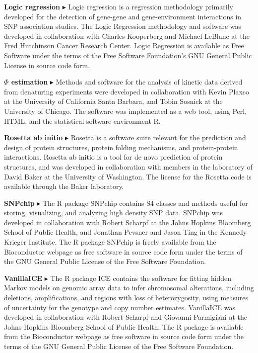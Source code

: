 \documentclass[10pt]{article}
\begin{document}
\item 
{\bf Logic regression} $\blacktriangleright$
Logic regression is a regression methodology primarily developed for the detection of gene-gene and gene-environment interactions in SNP association studies. The Logic Regression methodology and software was developed in collaboration with Charles Kooperberg and Michael LeBlanc at the Fred Hutchinson Cancer Research Center. Logic Regression is available as Free Software under the terms of the Free Software Foundation's GNU General Public License in source code form.
\item 
{\bf $\Phi$ estimation} $\blacktriangleright$
Methods and software for the analysis of kinetic data derived from denaturing experiments were developed in collaboration with Kevin Plaxco at the University of California Santa Barbara, and Tobin Sosnick at the University of Chicago. The software was implemented as a web tool, using Perl, HTML, and the statistical software environment R.
\item
{\bf Rosetta ab initio} $\blacktriangleright$
Rosetta is a software suite relevant for the prediction and design of protein structures, protein folding mechanisms, and protein-protein interactions. Rosetta ab initio is a tool for de novo prediction of protein structures, and was developed in collaboration with members in the laboratory of David Baker at the University of Washington. The license for the Rosetta code is available through the Baker laboratory. 
\item 
{\bf SNPchip} $\blacktriangleright$
The R package SNPchip contains S4 classes and methods useful for storing, visualizing, and analyzing high density SNP data. SNPchip was developed in collaboration with Robert Scharpf at the Johns Hopkins Bloomberg School of Public Health, and Jonathan Pevsner and Jason Ting in the Kennedy Krieger Institute. The R package SNPchip is freely available from the Bioconductor webpage as free software in source code form under the terms of the GNU General Public License of the Free Software Foundation.
\item
{\bf VanillaICE} $\blacktriangleright$
The R package ICE contains the software for fitting hidden Markov models on genomic array data to infer chromosomal alterations, including deletions, amplifications, and regions with loss of heterozygosity, using measures of uncertainty for the genotype and copy number estimates. VanillaICE was developed in collaboration with Robert Scharpf and Giovanni Parmigiani at the Johns Hopkins Bloomberg School of Public Health. The R package is available from the Bioconductor webpage as free software in source code form under the terms of the GNU General Public License of the Free Software Foundation.
\end{document}
